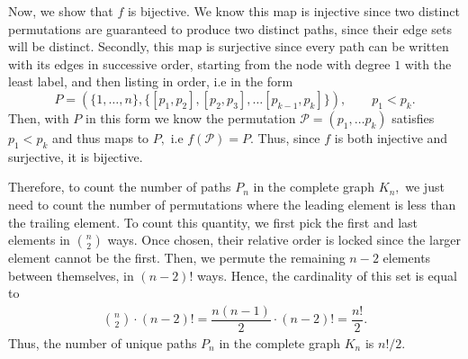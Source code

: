 \documentclass{article}
\begin{document}
\begin{enumerate}
    Now, we show that $f$ is bijective. We know this map is injective
    since two distinct permutations are guaranteed to produce two
    distinct paths, since their edge sets will be distinct. Secondly,
    this map is surjective since every path can be written with its
    edges in successive order, starting from the node with degree $1$
    with the least label, and then listing in order, i.e in the form
    $$P = (\{1, \ldots, n\}, \{[p_1, p_2], [p_2, p_3], \ldots
    [p_{k-1}, p_k]\}), \qquad p_1 < p_k.$$
    Then, with $P$ in this form we know the permutation $\mathcal P =
    (p_1, \ldots p_k)$ satisfies $p_1 < p_k$ and thus maps to $P,$
    i.e $f(\mathcal P) = P.$ Thus, since $f$ is both injective and
    surjective, it is bijective.

    Therefore, to count the number of paths $P_n$ in the complete
    graph $K_n,$ we just need to count the number of permutations
    where the leading element is less than the trailing element. To
    count this quantity, we first pick the first and last elements in
    $n \choose 2$ ways. Once chosen, their relative order is locked
    since the larger element cannot be the first. Then, we permute
    the remaining $n-2$ elements between themselves, in $(n-2)!$
    ways. Hence, the cardinality of this set is equal to
    \begin{align*}
      {n \choose 2} \cdot  (n-2)! = \dfrac{n(n-1)}{2} \cdot (n-2)! =
      \dfrac{n!}{2}.
    \end{align*}
    Thus, the number of unique paths $P_n$ in the complete graph
    $K_n$ is $n!/2.$
\end{enumerate}
\end{document}
